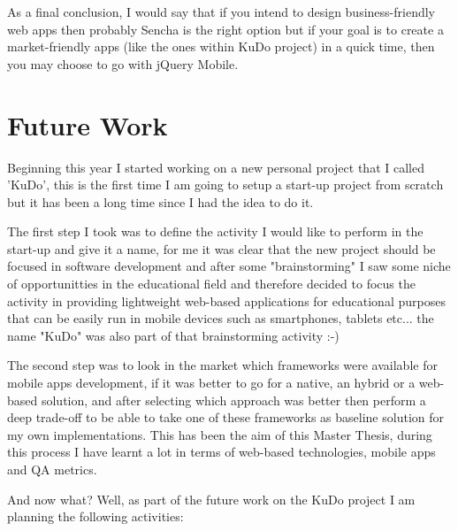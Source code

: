 \documentclass[a4paper,12pt]{book}
\begin{document}
As a final conclusion, I would say that if you intend to design business-friendly web apps then probably Sencha is the right option but if your goal is to create a market-friendly apps (like the ones within KuDo project) in a quick time, then you may choose to go with jQuery Mobile.


\chapter{Future Work}
\label{chap:future}

Beginning this year I started working on a new personal project that I called 'KuDo', this is the first time I am going to setup a start-up project from scratch but it has been a long time since I had the idea to do it. 

The first step I took was to define the activity I would like to perform in the start-up  and give it a name, for me it was clear that the new project should be focused in software development and after some "brainstorming" I saw some niche of opportunitties in the educational field and therefore decided to focus the activity in providing lightweight web-based applications for educational purposes that can be easily run in mobile devices such as smartphones, tablets etc... the name "KuDo" was also part of that brainstorming activity :-)

The second step was to look in the market which frameworks were available for mobile apps development, if it was better to go for a native, an hybrid or a web-based solution, and after selecting which approach was better then perform a deep trade-off to be able to take one of these frameworks as baseline solution for my own implementations. This has been the aim of this Master Thesis, during this process I have learnt a lot in terms of web-based technologies, mobile apps and QA metrics.

And now what? Well, as part of the future work on the KuDo project I am planning the following activities:
\end{document}
